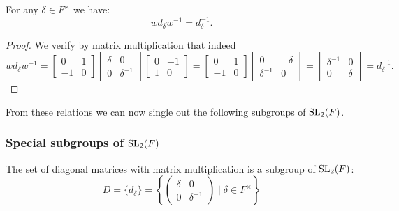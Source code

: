 \begin{lemma}
\label{SpecialMatrices.w_mul_d_eq_d_inv_w}
\leanok
For any $\delta \in F^\times$ we have:
\[ 
w d_\delta w^{-1} = d^{-1}_\delta.
\]
\end{lemma}
\begin{proof} 
We verify by matrix multiplication that indeed
\begin{equation*}
w d_\delta w^{-1} = \begin{bmatrix} 0 & 1 \\ - 1 & 0 \end{bmatrix} \begin{bmatrix} \delta & 0 \\ 0 & \delta^{-1} \end{bmatrix} \begin{bmatrix} 0 & - 1 \\ 1 & 0 \end{bmatrix} =  \begin{bmatrix} 0 & 1 \\ - 1 & 0 \end{bmatrix} \begin{bmatrix} 0 & - \delta \\ \delta^{-1} & 0 \end{bmatrix} \! = \! \begin{bmatrix} \delta^{-1} & 0 \\ 0 & \delta \end{bmatrix} \!= d^{-1}_\delta. 
\end{equation*}
\end{proof}

From these relations we can now single out the following subgroups of $\operatorname{SL}_2(F)$.

\subsubsection{Special subgroups of $\operatorname{SL}_2(F)$}

\begin{definition}
\label{SpecialSubgroups.D}
\leanok
    The set of diagonal matrices with matrix multiplication is a subgroup of $\operatorname{SL}_2(F)$: 
    \[
    D = \{d_\delta \} = \left\{ \begin{pmatrix}\delta & 0\\ 0 & \delta^{-1}\end{pmatrix} \; | \; \delta \in F^\times \right\}
    \]
\end{definition}


